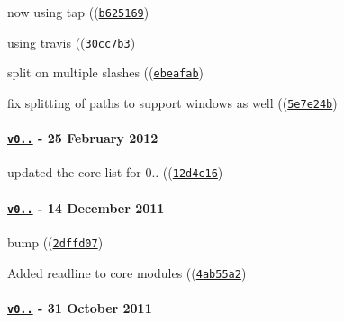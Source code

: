 \begin{DoxyItemize}
\item now using tap ((\href{https://github.com/browserify/resolve/commit/b62516922eaaafe533806cd385017109ea057baa}{\tt {\ttfamily b625169}})
\item using travis ((\href{https://github.com/browserify/resolve/commit/30cc7b3af9299a0e08f34c314015a1395ef16ea3}{\tt {\ttfamily 30cc7b3}})
\item split on multiple slashes ((\href{https://github.com/browserify/resolve/commit/ebeafab4a43c6ac4df7a8a7ee578629f81b7b9e7}{\tt {\ttfamily ebeafab}})
\item fix splitting of paths to support windows as well ((\href{https://github.com/browserify/resolve/commit/5e7e24bf11c48f14385886d7dd3661f786cc109b}{\tt {\ttfamily 5e7e24b}})
\end{DoxyItemize}

\paragraph*{\href{https://github.com/browserify/resolve/compare/v0.1.3...v0.2.0}{\tt v0..} -\/ 25 February 2012}


\begin{DoxyItemize}
\item updated the core list for 0.. ((\href{https://github.com/browserify/resolve/commit/12d4c164ef99bd35c13b0f566feaa70bc3560082}{\tt {\ttfamily 12d4c16}})
\end{DoxyItemize}

\paragraph*{\href{https://github.com/browserify/resolve/compare/v0.1.2...v0.1.3}{\tt v0..} -\/ 14 December 2011}


\begin{DoxyItemize}
\item bump ((\href{https://github.com/browserify/resolve/commit/2dffd072ce65b4aae4974e934ca5b58ec741f598}{\tt {\ttfamily 2dffd07}})
\item Added readline to core modules ((\href{https://github.com/browserify/resolve/commit/4ab55a2d4eb95be2399fe94fd5d33879271b5a9f}{\tt {\ttfamily 4ab55a2}})
\end{DoxyItemize}

\paragraph*{\href{https://github.com/browserify/resolve/compare/v0.1.1...v0.1.2}{\tt v0..} -\/ 31 October 2011}


